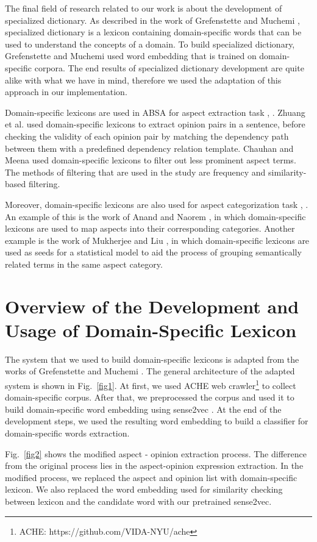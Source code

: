 \documentclass[a4paper,conference]{IEEEtran}
\begin{document}
The final field of research related to our work is about the development of specialized dictionary. As described in the work of Grefenstette and Muchemi \cite{b9}, specialized dictionary is a lexicon containing domain-specific words that can be used to understand the concepts of a domain. To build specialized dictionary, Grefenstette and Muchemi used word embedding that is trained on domain-specific corpora. The end results of specialized dictionary development are quite alike with what we have in mind, therefore we used the adaptation of this approach in our implementation.

Domain-specific lexicons are used in ABSA for aspect extraction task \cite{b10}, \cite{b11}. Zhuang et al. \cite{b10} used domain-specific lexicons to extract opinion pairs in a sentence, before checking the validity of each opinion pair by matching the dependency path between them with a predefined dependency relation template. Chauhan and Meena \cite{b11} used domain-specific lexicons to filter out less prominent aspect terms. The methods of filtering that are used in the study are frequency and similarity-based filtering.

Moreover, domain-specific lexicons are also used for aspect categorization task \cite{b12}, \cite{b13}. An example of this is the work of Anand and Naorem \cite{b12}, in which domain-specific lexicons are used to map aspects into their corresponding categories. Another example is the work of Mukherjee and Liu \cite{b13}, in which domain-specific lexicons are used as seeds for a statistical model to aid the process of grouping semantically related terms in the same aspect category.

\section{Overview of the Development and Usage of Domain-Specific Lexicon}
The system that we used to build domain-specific lexicons is adapted from the works of Grefenstette and Muchemi \cite{b9}. The general architecture of the adapted system is shown in Fig.~\ref{fig1}. At first, we used ACHE web crawler\footnote{ACHE: https://github.com/VIDA-NYU/ache} to collect domain-specific corpus. After that, we preprocessed the corpus and used it to build domain-specific word embedding using sense2vec \cite{b14}. At the end of the development steps, we used the resulting word embedding to build a classifier for domain-specific words extraction.

Fig.~\ref{fig2} shows the modified aspect - opinion extraction process. The difference from the original process lies in the aspect-opinion expression extraction. In the modified process, we replaced the aspect and opinion list with domain-specific lexicon. We also replaced the word embedding used for similarity checking between lexicon and the candidate word with our pretrained sense2vec.
\end{document}
